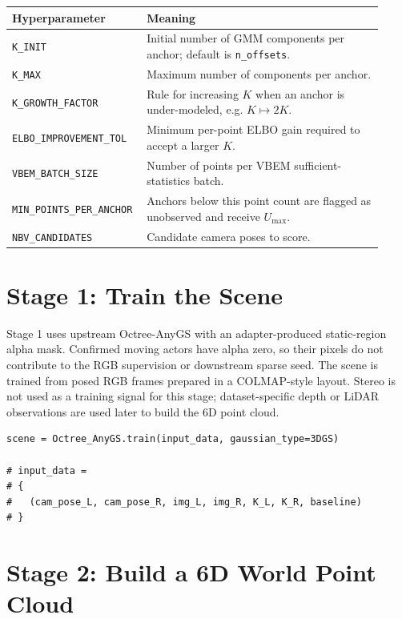 \documentclass[11pt]{article}
\newcommand{\Umax}{U_{\max}}
\begin{document}
\begin{table}[h]
  \centering
  \begin{tabular}{@{}p{0.30\linewidth}p{0.62\linewidth}@{}}
    \toprule
    Hyperparameter & Meaning \\
    \midrule
    \texttt{K\_INIT} &
      Initial number of GMM components per anchor; default is \texttt{n\_offsets}. \\
    \texttt{K\_MAX} &
      Maximum number of components per anchor. \\
    \texttt{K\_GROWTH\_FACTOR} &
      Rule for increasing \(K\) when an anchor is under-modeled, e.g. \(K \mapsto 2K\). \\
    \texttt{ELBO\_IMPROVEMENT\_TOL} &
      Minimum per-point ELBO gain required to accept a larger \(K\). \\
    \texttt{VBEM\_BATCH\_SIZE} &
      Number of points per VBEM sufficient-statistics batch. \\
    \texttt{MIN\_POINTS\_PER\_ANCHOR} &
      Anchors below this point count are flagged as unobserved and receive \(\Umax\). \\
    \texttt{NBV\_CANDIDATES} &
      Candidate camera poses to score. \\
    \bottomrule
  \end{tabular}
\end{table}

\section{Stage 1: Train the Scene}

Stage 1 uses upstream Octree-AnyGS with an adapter-produced static-region
alpha mask. Confirmed moving actors have alpha zero, so their pixels do not
contribute to the RGB supervision or downstream sparse seed. The scene is
trained from posed RGB frames prepared in a COLMAP-style layout. Stereo is not
used as a training signal for this stage; dataset-specific depth or LiDAR
observations are used later to build the 6D point cloud.

\begin{lstlisting}
scene = Octree_AnyGS.train(input_data, gaussian_type=3DGS)

# input_data =
# {
#   (cam_pose_L, cam_pose_R, img_L, img_R, K_L, K_R, baseline)
# }
\end{lstlisting}

\section{Stage 2: Build a 6D World Point Cloud}
\end{document}

